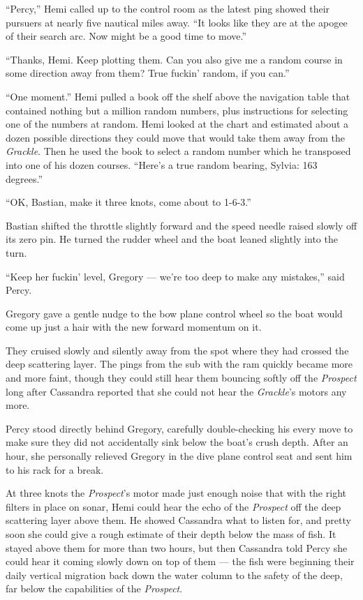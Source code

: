 \documentclass[
]{scrbook}
\begin{document}
``Percy,'' Hemi called up to the control room as the latest ping showed
their pursuers at nearly five nautical miles away. ``It looks like they
are at the apogee of their search arc. Now might be a good time to
move.''

``Thanks, Hemi. Keep plotting them. Can you also give me a random course
in some direction away from them? True fuckin' random, if you can.''

``One moment.'' Hemi pulled a book off the shelf above the navigation
table that contained nothing but a million random numbers, plus
instructions for selecting one of the numbers at random. Hemi looked at
the chart and estimated about a dozen possible directions they could
move that would take them away from the \emph{Grackle}. Then he used the
book to select a random number which he transposed into one of his dozen
courses. ``Here's a true random bearing, Sylvia: 163 degrees.''

``OK, Bastian, make it three knots, come about to 1-6-3.''

Bastian shifted the throttle slightly forward and the speed needle
raised slowly off its zero pin. He turned the rudder wheel and the boat
leaned slightly into the turn.

``Keep her fuckin' level, Gregory --- we're too deep to make any
mistakes,'' said Percy.

Gregory gave a gentle nudge to the bow plane control wheel so the boat
would come up just a hair with the new forward momentum on it.

They cruised slowly and silently away from the spot where they had
crossed the deep scattering layer. The pings from the sub with the ram
quickly became more and more faint, though they could still hear them
bouncing softly off the \emph{Prospect} long after Cassandra reported
that she could not hear the \emph{Grackle}'s motors any more.

Percy stood directly behind Gregory, carefully double-checking his every
move to make sure they did not accidentally sink below the boat's crush
depth. After an hour, she personally relieved Gregory in the dive plane
control seat and sent him to his rack for a break.

At three knots the \emph{Prospect}'s motor made just enough noise that
with the right filters in place on sonar, Hemi could hear the echo of
the \emph{Prospect} off the deep scattering layer above them. He showed
Cassandra what to listen for, and pretty soon she could give a rough
estimate of their depth below the mass of fish. It stayed above them for
more than two hours, but then Cassandra told Percy she could hear it
coming slowly down on top of them --- the fish were beginning their
daily vertical migration back down the water column to the safety of the
deep, far below the capabilities of the \emph{Prospect}.
\end{document}
